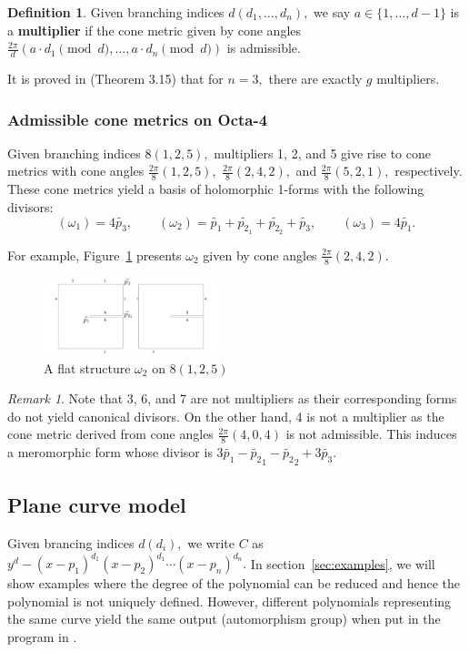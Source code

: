 \documentclass[12pt,reqno]{amsart}
\theoremstyle{definition}
\newtheorem{defn}{Definition}
\theoremstyle{remark}
\newtheorem*{remark}{Remark}
\begin{document}
\begin{defn} Given branching indices $d (d_1, \ldots , d_n),$ we say $a \in \{1, \ldots, d - 1\}$ is a \textbf{multiplier} if the cone metric given by cone angles $\frac{2 \pi}{d} (a \cdot d_1 \pmod d, \ldots , a \cdot d_n \pmod d)$ is admissible. 
\end{defn}

It is proved in \cite{dthesis} (Theorem 3.15) that for $n = 3,$ there are exactly $g$ multipliers. 

\subsubsection*{Admissible cone metrics on Octa-4} Given branching indices $8 (1, 2, 5),$ multipliers 1, 2, and 5 give rise to cone metrics with cone angles $\frac{2 \pi}{8}(1, 2, 5),$ $\frac{2 \pi}{8}(2, 4, 2),$ and $\frac{2 \pi}{8}(5, 2, 1),$ respectively. These cone metrics yield a basis of holomorphic 1-forms with the following divisors: $$(\omega_1) = 4 \widetilde{p_3}, \qquad (\omega_2) = \widetilde{p_1} + \widetilde{p_{2_1}} + \widetilde{p_{2_2}} + \widetilde{p_3}, \qquad (\omega_3) = 4 \widetilde{p_1}.$$

For example, Figure~\ref{fig:flat_rs2} presents $\omega_2$ given by cone angles $\frac{2 \pi}{8}(2, 4, 2).$

\begin{figure}[htbp] %
   \centering
   \includegraphics[width=2in]{figures/flat_rs2.pdf} 
	\caption{A flat structure $\omega_2$ on $8(1, 2, 5)$}
	\label{fig:flat_rs2}
\end{figure}


\begin{remark} Note that 3, 6, and 7 are not multipliers as their corresponding forms do not yield canonical divisors. On the other hand, 4 is not a multiplier as the cone metric derived from cone angles $\frac{2 \pi}{8} (4, 0, 4)$ is not admissible. This induces a meromorphic form whose divisor is $3 \widetilde{p_1} - \widetilde{p_2}_1 - \widetilde{p_2}_2 + 3 \widetilde{p_3}.$ \end{remark}

\subsection{Plane curve model}
\label{subsec:polynomial} Given brancing indices $d (d_i),$ we write $C$ as $y^d - (x - p_1)^{d_1} (x - p_2)^{d_1} \cdots (x - p_n)^{d_n}.$ In section~\ref{sec:examples}, we will show examples where the degree of the polynomial can be reduced and hence the polynomial is not uniquely defined. However, different polynomials representing the same curve yield the same output (automorphism group) when put in the program in \cite{jeroen}.
\end{document}
